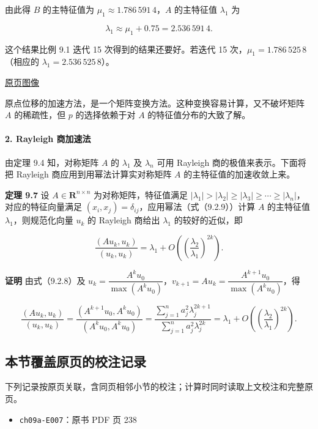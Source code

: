 \documentclass[
  10pt,
  fontset=fandol]{ctexart}
\providecommand{\tightlist}{%
  \setlength{\itemsep}{0pt}\setlength{\parskip}{0pt}}
\begin{document}
由此得 \(B\) 的主特征值为 \(\mu_1\approx1.786\,591\,4\)，\(A\) 的主特征值 \(\lambda_1\) 为

\[
\lambda_1\approx\mu_1+0.75=2.536\,591\,4.
\]

这个结果比例 9.1 迭代 15 次得到的结果还要好。若迭代 15 次，\(\mu_1=1.786\,525\,8\)（相应的 \(\lambda_1=2.536\,525\,8\)）。

\href{../../source-images/pdf-240.jpeg}{原页图像}

原点位移的加速方法，是一个矩阵变换方法。这种变换容易计算，又不破坏矩阵 \(A\) 的稀疏性，但 \(p\) 的选择依赖于对 \(A\) 的特征值分布的大致了解。

\paragraph{2. Rayleigh 商加速法}\label{rayleigh-ux5546ux52a0ux901fux6cd5}

由定理 9.4 知，对称矩阵 \(A\) 的 \(\lambda_1\) 及 \(\lambda_n\) 可用 Rayleigh 商的极值来表示。下面将把 Rayleigh 商应用到用幂法计算实对称矩阵 \(A\) 的主特征值的加速收敛上来。

\textbf{定理 9.7} 设 \(A\in\mathbf R^{n\times n}\) 为对称矩阵，特征值满足 \(|\lambda_1|>|\lambda_2|\geq|\lambda_3|\geq\cdots\geq|\lambda_n|\)，对应的特征向量满足 \((x_i,x_j)=\delta_{ij}\)，应用幂法（式（9.2.9））计算 \(A\) 的主特征值 \(\lambda_1\)，则规范化向量 \(u_k\) 的 Rayleigh 商给出 \(\lambda_1\) 的较好的近似，即

\[
\frac{(Au_k,u_k)}{(u_k,u_k)}=\lambda_1+O\left(\left(\frac{\lambda_2}{\lambda_1}\right)^{2k}\right).
\]

\textbf{证明} 由式（9.2.8）及 \(u_k=\dfrac{A^ku_0}{\max(A^ku_0)}\)，\(v_{k+1}=Au_k=\dfrac{A^{k+1}u_0}{\max(A^ku_0)}\)，得

\[
\frac{(Au_k,u_k)}{(u_k,u_k)}=\frac{(A^{k+1}u_0,A^ku_0)}{(A^ku_0,A^ku_0)}=\frac{\displaystyle\sum_{j=1}^na_j^2\lambda_j^{2k+1}}{\displaystyle\sum_{j=1}^na_j^2\lambda_j^{2k}}=\lambda_1+O\left(\left(\frac{\lambda_2}{\lambda_1}\right)^{2k}\right).
\tag{9.2.11}
\]

\subsection{本节覆盖原页的校注记录}\label{ux672cux8282ux8986ux76d6ux539fux9875ux7684ux6821ux6ce8ux8bb0ux5f55}

下列记录按原页关联，含同页相邻小节的校注；计算时同时读取上文校注和完整原页。

\begin{itemize}
\tightlist
\item
  \texttt{ch09a-E007}：原书 PDF 页 238
\end{itemize}
\end{document}
